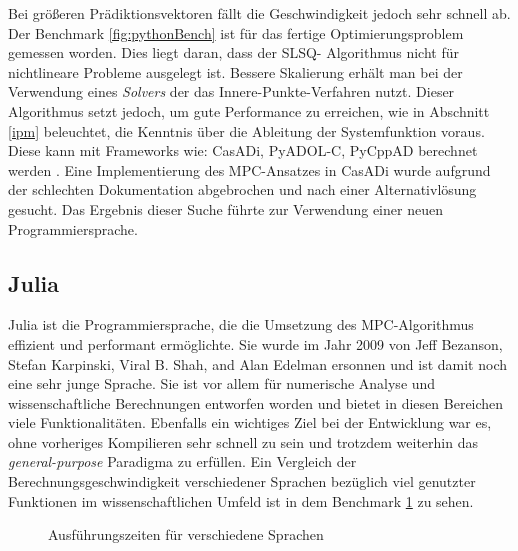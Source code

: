 \documentclass{like}
\begin{document}
Bei größeren Prädiktionsvektoren fällt die Geschwindigkeit jedoch sehr schnell ab. Der Benchmark \ref{fig:pythonBench} ist für das fertige Optimierungsproblem gemessen worden.
Dies liegt daran, dass der SLSQ- Algorithmus nicht für nichtlineare Probleme ausgelegt ist. Bessere Skalierung erhält man bei der Verwendung eines \textit{Solvers} der das Innere-Punkte-Verfahren nutzt. Dieser Algorithmus setzt jedoch, um gute Performance zu erreichen, wie in Abschnitt \ref{ipm} beleuchtet, die Kenntnis über die Ableitung der Systemfunktion voraus. Diese kann mit Frameworks wie: CasADi, PyADOL-C, PyCppAD berechnet werden \cite{DBLP:journals/corr/TurkinT16}. 
Eine Implementierung des \ac{MPC}-Ansatzes in CasADi wurde  aufgrund der schlechten Dokumentation abgebrochen und nach einer Alternativlösung gesucht. Das Ergebnis dieser Suche führte zur Verwendung einer neuen Programmiersprache. 


\subsection{Julia}
\label{julia}
Julia ist die Programmiersprache, die die Umsetzung des \acl{MPC}-Algorithmus effizient und performant ermöglichte. Sie wurde im Jahr 2009 von Jeff Bezanson, Stefan Karpinski, Viral B. Shah, and Alan Edelman ersonnen und ist damit noch eine sehr junge Sprache. Sie ist vor allem für numerische Analyse und wissenschaftliche Berechnungen entworfen worden und bietet in diesen Bereichen viele Funktionalitäten. Ebenfalls ein wichtiges Ziel bei der Entwicklung war es, ohne vorheriges Kompilieren sehr schnell zu sein und trotzdem weiterhin das \textit{general-purpose} Paradigma zu erfüllen. Ein Vergleich der Berechnungsgeschwindigkeit verschiedener Sprachen bezüglich viel genutzter Funktionen im wissenschaftlichen Umfeld ist in dem Benchmark \ref{fig:juliaBench} zu sehen.

\begin{figure}[ht!]
	\centering
	 
	\caption{Ausführungszeiten für verschiedene Sprachen}
	\label{fig:juliaBench}
\end{figure}
\end{document}
